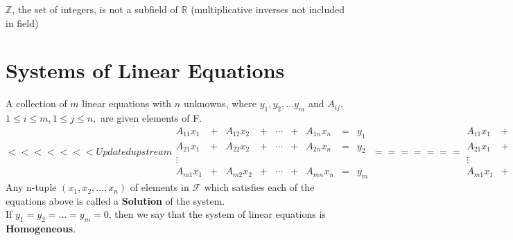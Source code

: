 \documentclass[../Main.tex]{subfiles}
\begin{document}
$\mathbb{Z}$, the set of integers, is not a subfield of $\mathbb{R}$ (multiplicative inverses not included in field)


\section{Systems of Linear Equations}
A collection of $m$ linear equations with $n$ unknowns, where $y_1, y_2, \dots y_{m}$ and $A_{ij}$, $1 \leq i \leq m, 1 \leq j \leq n,$ are given elements of F. 
\begin{equation}
<<<<<<< Updated upstream
   \begin{matrix} \label{linear eq sys}
      A_{11}x_{1} &+& A_{12}x_{2} &+ &\cdots&+& A_{1n}x_{n} &=& y_{1}\\
      A_{21}x_{1} &+& A_{22}x_{2} &+ &\cdots&+& A_{2n}x_{n} &=& y_{2}\\
      \vdots\\
      A_{m1}x_{1} &+& A_{m2}x_{2} &+ &\cdots&+& A_{mn}x_{n} &=& y_{m}
   \end{matrix}
=======
\begin{matrix}
   A_{11}x_{1} &+& A_{12}x_{2} &+ &\cdots&+& A_{1n}x_{n} &=& y_{1}\\
   A_{21}x_{1} &+& A_{22}x_{2} &+ &\cdots&+& A_{2n}x_{n} &=& y_{2}\\
   \vdots\\
   A_{m1}x_{1} &+& A_{m2}x_{2} &+ &\cdots&+& A_{mn}x_{n} &=& y_{m} 
\end{matrix}
>>>>>>> Stashed changes
\end{equation}
Any n-tuple $(x_1, x_2, \dots, x_n)$ of elements in $\mathcal{F}$ which satisfies each of the equations above is called a \textbf{Solution} of the system.\\
If $y_1=y_2=\dots=y_m=0$, then we say that the system of linear equations is \textbf{Homogeneous}.

\end{document}

